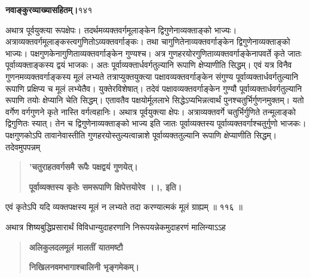 \documentclass[11pt, openany]{book}
\begin{document}
\onehalfspacing
\hspace{2in}\textbf{नवाङ्कुरव्याख्यासहितम्।}\hspace{2in}१४१

\vspace{5mm}

\begin{sloppypar}
\hangindent=0.2in \hspace{0.2in}अथात्र पूर्वयुक्त्या रूपक्षेपः। तदर्थमव्यक्तवर्गमूलाङ्केन द्विगुणेनाव्यक्ताङ्को भाज्यः। अत्राव्यक्तवर्गमूलाङ्कस्त्वगुणितोऽव्यक्तवर्गाङ्कः। तथा चागुणितेनाव्यक्तवर्गाङ्केन द्विगुणेनाव्यक्ताङ्को भाज्यः। पक्षगुणकेनागुणिताव्यक्तवर्गाङ्केन गुण्यश्च। अत्र गुणहरयोरगुणिताव्यक्तवर्गाङ्केनापवर्ते कृते जातः पूर्वाव्यक्ताङ्कस्य द्वयं भाजकः। अतः पूर्वाव्यक्तार्धवर्गतुल्यानि रूपाणि क्षेप्याणीति सिद्धम्। एवं यत्र विनैव गुणनमव्यक्तवर्गाङ्कस्य मूलं लभ्यते तत्राप्युक्तयुक्त्या पक्षावव्यक्तवर्गाङ्केन संगुण्य पूर्वाव्यक्तार्धवर्गतुल्यानि रूपाणि प्रक्षिप्य च मूलं लभ्येतैव। युक्तेरविशेषात्। तदेवं पक्षावव्यक्तवर्गाङ्केन गुण्यौ पूर्वाव्यक्तार्धवर्गतुल्यानि रूपाणि तयोः क्षेप्यानि चेति सिद्धम्। एतावतैव पक्षयोर्मूललाभे सिद्धेऽप्यभिन्नत्वार्थं पुनश्चतुर्भिर्गुणनमुक्तम्। यतो वर्गेण वर्गगुणने कृते नास्ति वर्गत्वहानिः। अथात्र पूर्वयुक्त्या क्षेपः। अत्राव्यक्तवर्गे चतुर्भिर्गुणिते तन्मूलाङ्को द्विगुणितः स्यात्। तेन च द्विगुणेनाव्यक्ताङ्को भाज्य इति जातः पूर्वाव्यक्तस्य पूर्वाव्यक्तवर्गाश्चतुर्गुणो भाजकः। पक्षगुणकोऽपि तावानेवास्तीति गुणहरयोस्तुल्यत्वान्नाशे पूर्वाव्यक्ततुल्यानि रूपाणि क्षेप्याणीति सिद्धम्। तदेवमुपपन्नम्\textendash

\begin{quote}
\hspace{1in}\textbf{'चतुराहतवर्गसमै रूपैः पक्षद्वयं गुणयेत्।}

\hspace{1in}\textbf{पूर्वाव्यक्तस्य कृतेः समरूपाणि क्षिपेत्तयोरेव ।।, इति।}
\end{quote}

\hangindent=0.2in \hspace{0.2in}एवं कृतेऽपि यदि व्यक्तपक्षस्य मूलं न लभ्यते तदा करण्यात्मकं मूलं ग्राह्यम् ॥ ११६ ॥

\hangindent=0.2in \hspace{0.2in}अथात्र शिष्यबुद्धिप्रसारार्थं विविधान्युदाहरणानि निरूपयन्नेकमुदाहरणं मालिन्याऽऽह\textendash

\begin{quote}
\hspace{1in}\textbf{अलिकुलदलमूलं मालतीं यातमष्टौ}

\hspace{1in}\textbf{निखिलनवमभागाश्चालिनी भृङ्गमेकम्।}


\end{quote}
\end{sloppypar}
\end{document}
